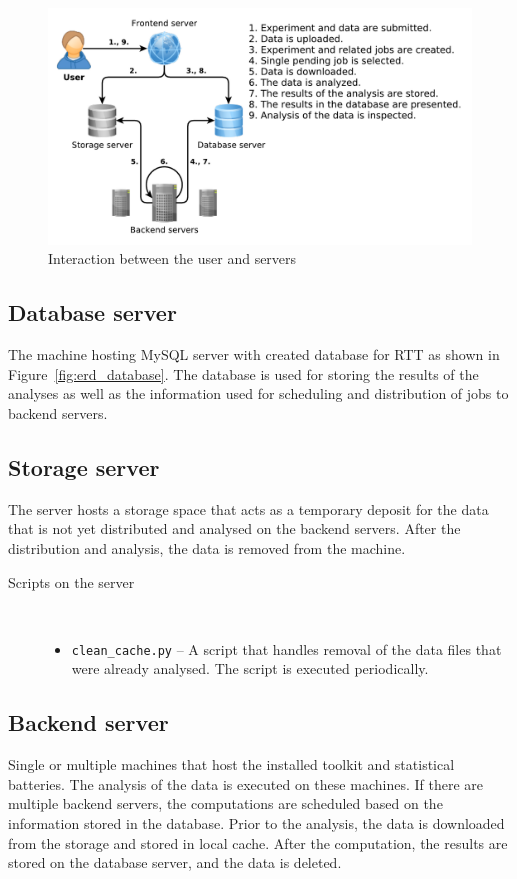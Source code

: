 \documentclass[
	digital,    %
	oneside,
	color,
	11pt,
	nocover,
	notable,
	nolof,
	nolot,
]{fithesis3}
\newenvironment{titlemize}[1]
{
	\begin{description}
	\item[#1]\
	\begin{itemize}
}
{
	\end{itemize}
 	\end{description}
}
\theoremstyle{definition}
\theoremstyle{remark}
\begin{document}
\begin{figure}[H]
\begin{nomar}
\centering
\includegraphics[width=\paperwidth-4cm]{figures/rtt-ecosystem.pdf}
\end{nomar}
\caption{Interaction between the user and servers}
\label{fig:rtt_ecosystem}
\end{figure}

\subsection{Database server}
The machine hosting MySQL server with created database for RTT as shown in Figure~\ref{fig:erd_database}. The database is used for storing the results of the analyses as well as the information used for scheduling and distribution of jobs to backend servers.

\subsection{Storage server}
The server hosts a storage space that acts as a temporary deposit for the data that is not yet distributed and analysed on the backend servers. After the distribution and analysis, the data is removed from the machine.

\begin{titlemize}{Scripts on the server}
\item \texttt{clean\_cache.py} -- A script that handles removal of the data files that were already analysed. The script is executed periodically.
\end{titlemize}

\subsection{Backend server}
Single or multiple machines that host the installed toolkit and statistical batteries. The analysis of the data is executed on these machines. If there are multiple backend servers, the computations are scheduled based on the information stored in the database. Prior to the analysis, the data is downloaded from the storage and stored in local cache. After the computation, the results are stored on the database server, and the data is deleted.
\end{document}
